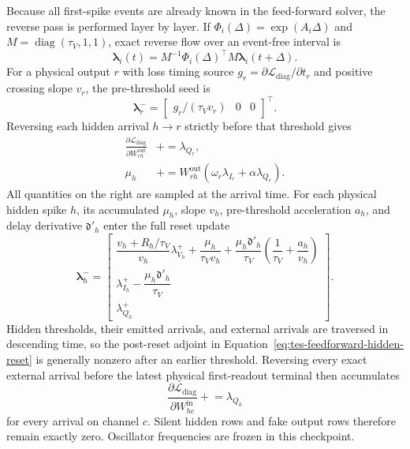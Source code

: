 Because all first-spike events are already known in the feed-forward solver,
the reverse pass is performed layer by layer.  If
$\Phi_i(\Delta)=\exp(A_i\Delta)$ and
$M=\operatorname{diag}(\tau_V,1,1)$, exact reverse flow over an event-free
interval is
\begin{equation}
    \boldsymbol\lambda_i(t)
      =M^{-1}\Phi_i(\Delta)^\top M
       \boldsymbol\lambda_i(t+\Delta).
    \label{eq:tes-exact-layerwise-adjoint-flow}
\end{equation}
For a physical output $r$ with loss timing source
$g_r=\partial\mathcal L_{\mathrm{diag}}/\partial t_r$ and positive crossing
slope $v_r$, the pre-threshold seed is
\begin{equation}
    \boldsymbol\lambda_r^-
      =\begin{bmatrix}g_r/(\tau_Vv_r)&0&0\end{bmatrix}^{\!\top}.
\end{equation}
Reversing each hidden arrival $h\to r$ strictly before that threshold gives
\begin{align}
    \frac{\partial\mathcal L_{\mathrm{diag}}}
         {\partial W^{\mathrm{out}}_{rh}}
      &\mathrel{+}=\lambda_{Q_r},\\
    \mu_h
      &\mathrel{+}=W^{\mathrm{out}}_{rh}
        \left(\omega_r\lambda_{I_r}+\alpha\lambda_{Q_r}\right).
    \label{eq:tes-feedforward-readout-reverse}
\end{align}
All quantities on the right are sampled at the arrival time.  For each
physical hidden spike $h$, its accumulated $\mu_h$, slope $v_h$,
pre-threshold acceleration $a_h$, and delay derivative $\mathfrak d'_h$ enter
the full reset update
\begin{equation}
    \boldsymbol\lambda_h^-=
    \begin{bmatrix}
      \dfrac{v_h+R_h/\tau_V}{v_h}\lambda_{V_h}^+
      +\dfrac{\mu_h}{\tau_Vv_h}
      +\dfrac{\mu_h\mathfrak d'_h}{\tau_V}
       \left(\dfrac1{\tau_V}+\dfrac{a_h}{v_h}\right)\\[5pt]
      \lambda_{I_h}^+-\dfrac{\mu_h\mathfrak d'_h}{\tau_V}\\[5pt]
      \lambda_{Q_h}^+
    \end{bmatrix}.
    \label{eq:tes-feedforward-hidden-reset}
\end{equation}
Hidden thresholds, their emitted arrivals, and external arrivals are traversed
in descending time, so the post-reset adjoint in
Equation~\eqref{eq:tes-feedforward-hidden-reset} is generally nonzero after an
earlier threshold.  Reversing every exact external arrival before the latest
physical first-readout terminal then accumulates
\begin{equation}
    \frac{\partial\mathcal L_{\mathrm{diag}}}
         {\partial W^{\mathrm{in}}_{hc}}
      \mathrel{+}=\lambda_{Q_h}
\end{equation}
for every arrival on channel $c$.  Silent hidden rows and fake output rows
therefore remain exactly zero.  Oscillator frequencies are frozen in this
checkpoint.

